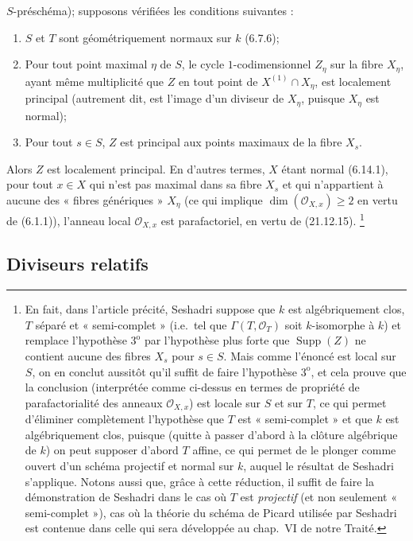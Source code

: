 \begin{env}[21.14.4]
$S$-préschéma); supposons vérifiées les conditions suivantes :
\begin{enumerate}[label=\arabic*\textsuperscript{o}]
  \item $S$ et $T$ sont géométriquement normaux sur $k$ (6.7.6);
  \item Pour tout point maximal $\eta$ de $S$, le cycle $1$-codimensionnel $Z_\eta$
  sur la fibre $X_\eta$, ayant même multiplicité que $Z$ en tout point de
  $X^{(1)}\cap X_\eta$, est localement principal (autrement dit, est l'image d'un
  diviseur de $X_\eta$, puisque $X_\eta$ est normal);
  \item Pour tout $s\in S$, $Z$ est principal aux points maximaux de la fibre $X_s$.
\end{enumerate}
Alors $Z$ est localement principal. En d'autres termes, $X$ étant normal (6.14.1),
pour tout $x\in X$ qui n'est pas maximal dans sa fibre $X_s$ et qui n'appartient à
aucune des « fibres génériques » $X_\eta$ (ce qui implique
$\dim(\mathcal O_{X,x})\geq2$ en vertu de (6.1.1)), l'anneau local
$\mathcal O_{X,x}$ est parafactoriel, en vertu de (21.12.15).
\footnote{En fait, dans l'article précité, Seshadri suppose que $k$ est algébriquement
clos, $T$ séparé et « semi-complet » (i.e.\ tel que
$\Gamma(T,\mathcal O_T)$ soit $k$-isomorphe à $k$) et remplace l'hypothèse
$3^{\mathrm o}$ par l'hypothèse plus forte que $\operatorname{Supp}(Z)$ ne contient
aucune des fibres $X_s$ pour $s\in S$. Mais comme l'énoncé est local sur $S$, on en
conclut aussitôt qu'il suffit de faire l'hypothèse $3^{\mathrm o}$, et cela prouve que
la conclusion (interprétée comme ci-dessus en termes de propriété de parafactorialité
des anneaux $\mathcal O_{X,x}$) est locale sur $S$ et sur $T$, ce qui permet
d'éliminer complètement l'hypothèse que $T$ est « semi-complet » et que $k$ est
algébriquement clos, puisque (quitte à passer d'abord à la clôture algébrique de $k$)
on peut supposer d'abord $T$ affine, ce qui permet de le plonger comme ouvert d'un
schéma projectif et normal sur $k$, auquel le résultat de Seshadri s'applique. Notons
aussi que, grâce à cette réduction, il suffit de faire la démonstration de Seshadri dans
le cas où $T$ est \emph{projectif} (et non seulement « semi-complet »), cas où la
théorie du schéma de Picard utilisée par Seshadri est contenue dans celle qui sera
développée au chap.~VI de notre Traité.}
\end{env}

\subsection{Diviseurs relatifs}
\label{subsection:IV.21.15}
\label{IV.21.15}

